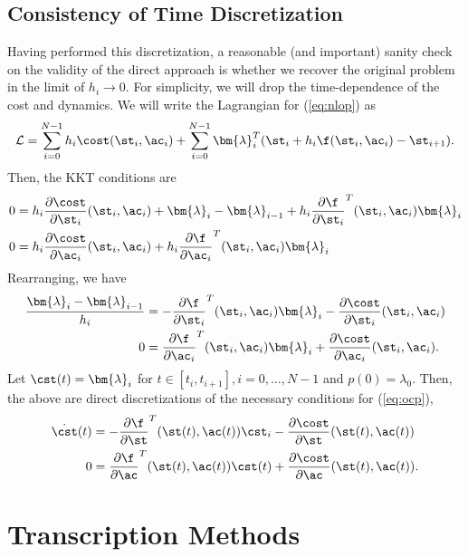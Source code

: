 \subsection{Consistency of Time Discretization}

Having performed this discretization, a reasonable (and important) sanity check on the validity of the direct approach is whether we recover the original problem in the limit of $h_i \to 0$. For simplicity, we will drop the time-dependence of the cost and dynamics. We will write the Lagrangian for (\ref{eq:nlop}) as 
\begin{equation}
    \mathcal{L} = \sum_{i=0}^{N-1} h_i \cost(\st_i,\ac_i) + \sum_{i=0}^{N-1} \bm{\lambda}_i^T (\st_i + h_i \f(\st_i,\ac_i) - \st_{i+1}).
\end{equation}
Then, the KKT conditions are
\begin{align}
    0 &= h_i \frac{\partial \cost}{\partial \st_i}(\st_i,\ac_i) + \bm{\lambda}_i - \bm{\lambda}_{i-1} + h_i \frac{\partial \f}{\partial \st_i}^T(\st_i,\ac_i) \bm{\lambda}_i\\
    0 &= h_i \frac{\partial \cost}{\partial \ac_i}(\st_i,\ac_i) + h_i \frac{\partial \f}{\partial \ac_i}^T(\st_i,\ac_i) \bm{\lambda}_i
\end{align}
Rearranging, we have
\begin{align}
    \frac{\bm{\lambda}_i - \bm{\lambda}_{i-1}}{h_i} &=- \frac{\partial \f}{\partial \st_i}^T(\st_i,\ac_i) \bm{\lambda}_i- \frac{\partial \cost}{\partial \st_i}(\st_i,\ac_i)\\
    0 &= \frac{\partial \f}{\partial \ac_i}^T(\st_i,\ac_i) \bm{\lambda}_i + \frac{\partial \cost}{\partial \ac_i}(\st_i,\ac_i).
\end{align}
Let $\cst(t) = \bm{\lambda}_i$ for $t \in [t_i, t_{i+1}], i = 0, \ldots, N-1$ and $p(0) = \lambda_0$. Then, the above are direct discretizations of the necessary conditions for (\ref{eq:ocp}), 
\begin{align}
    \dot{\cst}(t) &=- \frac{\partial \f}{\partial \st}^T(\st(t),\ac(t)) \cst_i- \frac{\partial \cost}{\partial \st}(\st(t),\ac(t))\\
    0 &= \frac{\partial \f}{\partial \ac}^T(\st(t),\ac(t)) \cst(t) + \frac{\partial \cost}{\partial \ac}(\st(t),\ac(t)).
\end{align}

\section{Transcription Methods}

